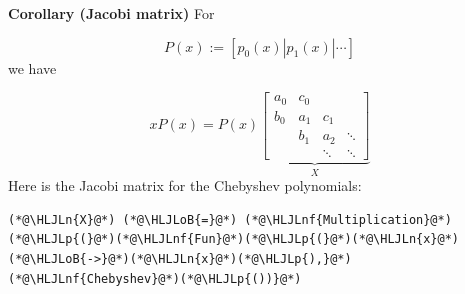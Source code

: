 \documentclass[12pt,a4paper]{article}
\newcommand{\HLJLn}[1]{#1}
\newcommand{\HLJLnf}[1]{\textcolor[RGB]{66,102,213}{#1}}
\newcommand{\HLJLoB}[1]{\textcolor[RGB]{102,102,102}{\textbf{#1}}}
\newcommand{\HLJLp}[1]{#1}
\begin{document}
\textbf{Corollary (Jacobi matrix)} For

\[
P(x) := [p_0(x) | p_1(x) | \ensuremath{\cdots}]
\]
we have

\[
x P(x) = P(x) \underbrace{\begin{bmatrix} a_0 & c_0 \\
                                                        b_0 & a_1 & c_1\\
                                                        & b_1 & a_2 & \ensuremath{\ddots} \\
                                                        && \ensuremath{\ddots} & \ensuremath{\ddots}
                                                        \end{bmatrix}}_X
\]
Here is the Jacobi matrix for the Chebyshev polynomials:


\begin{lstlisting}
(*@\HLJLn{X}@*) (*@\HLJLoB{=}@*) (*@\HLJLnf{Multiplication}@*)(*@\HLJLp{(}@*)(*@\HLJLnf{Fun}@*)(*@\HLJLp{(}@*)(*@\HLJLn{x}@*)(*@\HLJLoB{->}@*)(*@\HLJLn{x}@*)(*@\HLJLp{),}@*)(*@\HLJLnf{Chebyshev}@*)(*@\HLJLp{())}@*)
\end{lstlisting}
\end{document}
